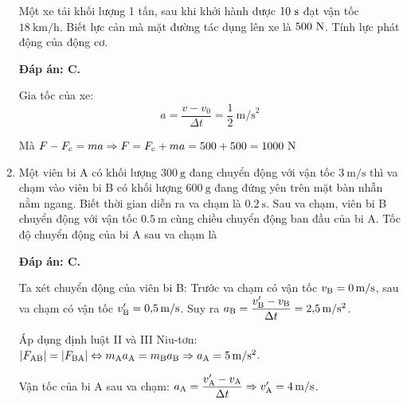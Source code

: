 \begin{enumerate}[label=\bfseries Câu \arabic*:]
	\cauhoi
	{Một xe tải khối lượng 1 tấn, sau khi khởi hành được $10\ \text s$ đạt vận tốc $18\ \text{km/h}$. Biết lực cản mà mặt đường tác dụng lên xe là $500\ \text N$. Tính lực phát động của động cơ.
	}
	
	\loigiai
	{\textbf{Đáp án: C.}
		
		Gia tốc của xe:
		\[a = \dfrac{v-v_0}{\Delta t} = \dfrac{1}{2}\ \text{m/s}^2\]
		
		Mà $F-F_\text c = ma \Rightarrow F = F_\text c + ma = 500 + 500 = 1000\ \text N$
		
		
	}
	\item {}
	
	\cauhoi
	{Một viên bi A có khối lượng $\SI{300}{\gram}$ đang chuyển động với vận tốc $\SI{3}{\meter / \second}$ thì va chạm vào viên bi B có khối lượng $\SI{600}{\gram}$ đang đứng yên trên mặt bàn nhẵn nằm ngang. Biết thời gian diễn ra va chạm là $\SI{0.2}{\second}$. Sau va chạm, viên bi B chuyển động với vận tốc $\SI{0.5}{\meter}$ cùng chiều chuyển động ban đầu của bi A. Tốc độ chuyển động của bi A sau va chạm là
	}
	
	\loigiai
	{\textbf{Đáp án: C.}
		
		Ta xét chuyển động của viên bi B: Trước va chạm có vận tốc $v_\text B = \SI{0}{\meter / \second}$, sau va chạm có vận tốc $v_\text B'=\SI{0.5}{\meter/ \second}$. Suy ra $a_\text B=\dfrac{v_\text B'-v_\text B}{\Delta t}=\SI{2.5}{\meter / \second \squared}$.
		
		Áp dụng định luật II và III Niu-tơn:
		$|F_\text {AB}| = |F_\text {BA}| \Leftrightarrow m_\text A a_\text A = m_\text B a_\text B \Rightarrow a_\text A = \SI{5}{\meter / \second \squared}$.
		
		Vận tốc của bi A sau va chạm: $a_\text A = \dfrac{v_\text A'-v_\text A}{\Delta t}\Rightarrow v_\text A' = \SI{4}{\meter / \second}$.
		
}
\end{enumerate}
